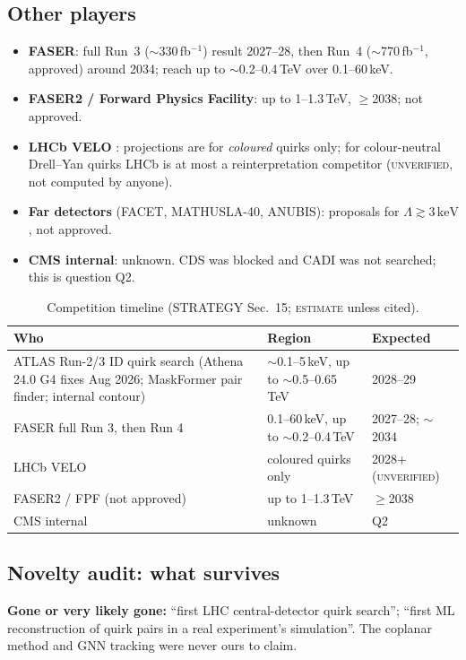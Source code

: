 \documentclass[11pt,a4paper]{article}
\newcommand{\EST}{\textsc{estimate}}
\newcommand{\UNV}{\textsc{unverified}}
\newcommand{\keV}{\,\mathrm{keV}}
\begin{document}
\subsection{Other players}
\begin{itemize}
\item \textbf{FASER}: full Run~3 ($\sim$330\,fb$^{-1}$) result 2027--28, then Run~4 ($\sim$770\,fb$^{-1}$, approved) around 2034; reach up to $\sim$0.2--0.4\,TeV over 0.1--60\,keV.
\item \textbf{FASER2 / Forward Physics Facility}: up to 1--1.3\,TeV, $\geq$2038; not approved.
\item \textbf{LHCb VELO} \cite{LHCb}: projections are for \emph{coloured} quirks only; for colour-neutral Drell--Yan quirks LHCb is at most a reinterpretation competitor (\UNV, not computed by anyone).
\item \textbf{Far detectors} (FACET, MATHUSLA-40, ANUBIS): proposals for $\Lambda\gtrsim3\keV$, not approved.
\item \textbf{CMS internal}: unknown. CDS was blocked and CADI was not searched; this is question Q2.
\end{itemize}

{\small
\begin{longtable}{@{}L{6.89cm}L{4.38cm}L{5.11cm}@{}}
\caption{Competition timeline (STRATEGY Sec.~15; \EST{} unless cited).}\label{tab:comp}\\
\toprule Who & Region & Expected\\\midrule\endfirsthead
\bottomrule\endfoot
ATLAS Run-2/3 ID quirk search (Athena 24.0 G4 fixes Aug 2026; MaskFormer pair finder; internal contour) & $\sim$0.1--5\,keV, up to $\sim$0.5--0.65\,TeV & 2028--29\\
FASER full Run 3, then Run 4 & 0.1--60\,keV, up to $\sim$0.2--0.4\,TeV & 2027--28; $\sim$2034\\
LHCb VELO & coloured quirks only & 2028+ (\UNV)\\
FASER2 / FPF (not approved) & up to 1--1.3\,TeV & $\geq$2038\\
CMS internal & unknown & Q2\\
\end{longtable}
}

\subsection{Novelty audit: what survives}
\textbf{Gone or very likely gone:} ``first LHC central-detector quirk search''; ``first ML reconstruction of quirk pairs in a real experiment's simulation''. The coplanar method \cite{Knapen} and GNN tracking \cite{Sha} were never ours to claim.
\end{document}
